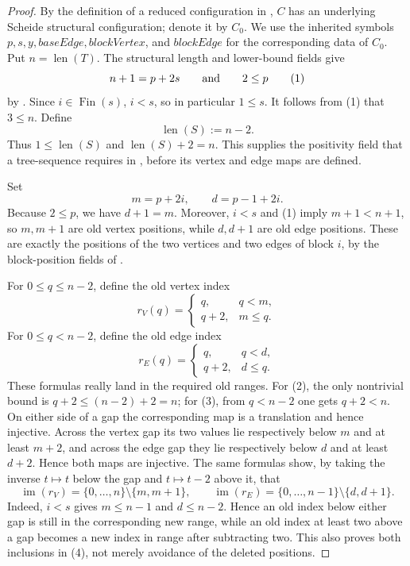 \begin{proof}
By the definition of a reduced configuration in
, $C$ has an underlying Scheide
structural configuration; denote it by $C_0$.  We use the inherited
symbols $p,s,y,\mathit{baseEdge},\mathit{blockVertex}$, and
$\mathit{blockEdge}$ for the corresponding data of $C_0$.  Put
$n=\operatorname{len}(T)$.  The structural length and lower-bound fields
give
\[
 n+1=p+2s\qquad\hbox{and}\qquad 2\leq p
\tag{1}
\]
by .  Since $i\in\operatorname{Fin}(s)$,
$i<s$, so in particular $1\leq s$.  It follows from (1) that $3\leq n$.
Define
\[
 \operatorname{len}(S):=n-2.
\]
Thus $1\leq\operatorname{len}(S)$ and
$\operatorname{len}(S)+2=n$.  This supplies the positivity field that a
tree-sequence requires in , before its vertex and
edge maps are defined.

Set
\[
 m=p+2i,
 \qquad
 d=p-1+2i.
\]
Because $2\leq p$, we have $d+1=m$.  Moreover, $i<s$ and (1) imply
$m+1<n+1$, so $m,m+1$ are old vertex positions, while $d,d+1$ are old
edge positions.  These are exactly the positions of the two vertices and
two edges of block $i$, by the block-position fields of
.

For $0\leq q\leq n-2$, define the old vertex index
\[
 r_V(q)=\begin{cases}
 q,&q<m,\\
 q+2,&m\leq q.
 \end{cases}
\tag{2}
\]
For $0\leq q<n-2$, define the old edge index
\[
 r_E(q)=\begin{cases}
 q,&q<d,\\
 q+2,&d\leq q.
 \end{cases}
\tag{3}
\]
These formulas really land in the required old ranges.  For (2), the
only nontrivial bound is $q+2\leq(n-2)+2=n$; for (3), from $q<n-2$ one
gets $q+2<n$.  On either side of a gap the corresponding map is a
translation and hence injective.  Across the vertex gap its two values
lie respectively below $m$ and at least $m+2$, and across the edge gap
they lie respectively below $d$ and at least $d+2$.  Hence both maps are
injective.  The same formulas show, by taking the inverse $t\mapsto t$
below the gap and $t\mapsto t-2$ above it, that
\[
 \operatorname{im}(r_V)=\{0,\ldots,n\}\setminus\{m,m+1\},
 \qquad
 \operatorname{im}(r_E)=\{0,\ldots,n-1\}\setminus\{d,d+1\}.
\tag{4}
\]
Indeed, $i<s$ gives $m\leq n-1$ and $d\leq n-2$.  Hence an old index
below either gap is still in the corresponding new range, while an old
index at least two above a gap becomes a new index in range after
subtracting two.  This also proves both inclusions in (4), not merely
avoidance of the deleted positions.


\end{proof}
